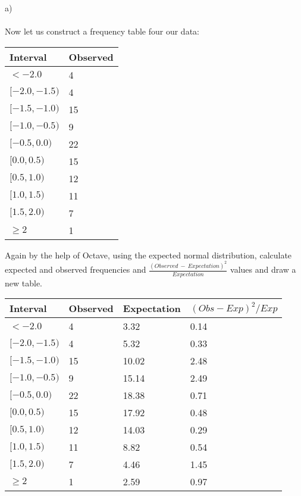 \documentclass[12pt]{article}
\begin{document}
a)\\ \\
Now let us construct a frequency table four our data:\\
\begin{center}
    \begin{tabular}{| l | l |}
        \hline
        Interval & Observed \\
        \hline
        $< -2.0$ & 4 \\
        \hline
        $[-2.0, -1.5)$ & 4 \\
        \hline
        $[-1.5, -1.0)$ & 15 \\
        \hline 
        $[-1.0, -0.5)$ & 9 \\
        \hline
        $[-0.5, 0.0)$ & 22 \\
        \hline
        $[0.0, 0.5)$ & 15 \\
        \hline
        $[0.5, 1.0)$ & 12 \\
        \hline
        $[1.0, 1.5)$ & 11 \\
        \hline
        $[1.5, 2.0)$ & 7 \\
        \hline
        $\geq 2$ & 1 \\
        \hline
    \end{tabular}
\end{center}

Again by the help of Octave, using the expected normal distribution, calculate expected and observed frequencies and $\frac{(Observed\ -\ Expectation)^2}{Expectation}$ values and draw a new table.\\

\begin{center}
    \begin{tabular}{| l | l | l | l |} 
    \hline
        Interval       & Observed & Expectation & $(Obs-Exp)^2 / Exp$\\\hline
        $< -2.0$       & 4        & 3.32        & 0.14               \\\hline
        $[-2.0, -1.5)$ & 4        & 5.32        & 0.33               \\\hline
        $[-1.5, -1.0)$ & 15       & 10.02       & 2.48               \\\hline 
        $[-1.0, -0.5)$ & 9        & 15.14       & 2.49               \\\hline
        $[-0.5, 0.0)$  & 22       & 18.38       & 0.71               \\\hline
        $[0.0, 0.5)$   & 15       & 17.92       & 0.48               \\\hline
        $[0.5, 1.0)$   & 12       & 14.03       & 0.29               \\\hline
        $[1.0, 1.5)$   & 11       & 8.82        & 0.54               \\\hline
        $[1.5, 2.0)$   & 7        & 4.46        & 1.45               \\\hline
        $\geq 2$       & 1        & 2.59        & 0.97               \\\hline
    \end{tabular}
\end{center}
\end{document}

